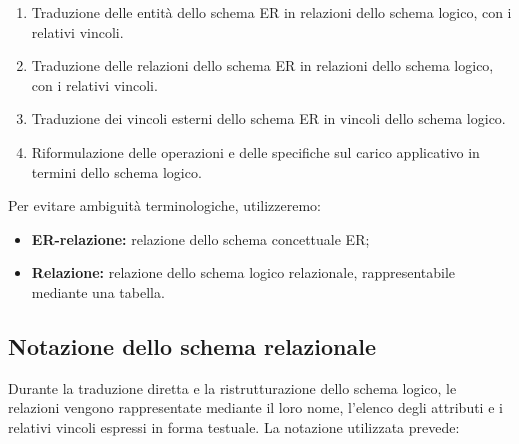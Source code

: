 \begin{enumerate}
    \item Traduzione delle entità dello schema ER
    in relazioni dello schema logico, con i
    relativi vincoli.

    \item Traduzione delle relazioni dello schema
    ER in relazioni dello schema logico, con i
    relativi vincoli.

    \item Traduzione dei vincoli esterni dello
    schema ER in vincoli dello schema logico.

    \item Riformulazione delle operazioni e delle
    specifiche sul carico applicativo in termini
    dello schema logico.
\end{enumerate}
\noindent
Per evitare ambiguità terminologiche, utilizzeremo:

\begin{itemize}
    \item \textbf{ER-relazione:} relazione dello
    schema concettuale ER;

    \item \textbf{Relazione:} relazione dello
    schema logico relazionale, rappresentabile
    mediante una tabella.
\end{itemize}


\subsection{Notazione dello schema relazionale}
Durante la traduzione diretta e la ristrutturazione
dello schema logico, le relazioni vengono
rappresentate mediante il loro nome, l'elenco
degli attributi e i relativi vincoli espressi
in forma testuale.
La notazione utilizzata prevede:

